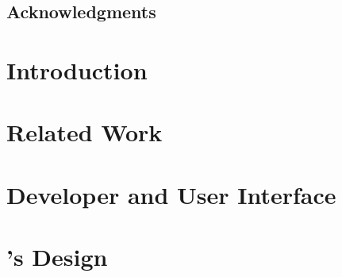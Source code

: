 \documentclass[11pt,twoside,final]{mitthesis}
\begin{document}



\maketitle

\begin{abstractpage}

\end{abstractpage}
\cleardoublepage

\section*{Acknowledgments}
  
\cleardoublepage


\tableofcontents
\clearpage
\listoffigures
\clearpage

\listoftodos


\chapter{Introduction}%
\label{ch:introduction}


\chapter{Related Work}%
\label{ch:related}


\chapter{Developer and User Interface}%
\label{ch:overview}


\chapter{\sys's Design}%
\label{ch:design}

\end{document}
